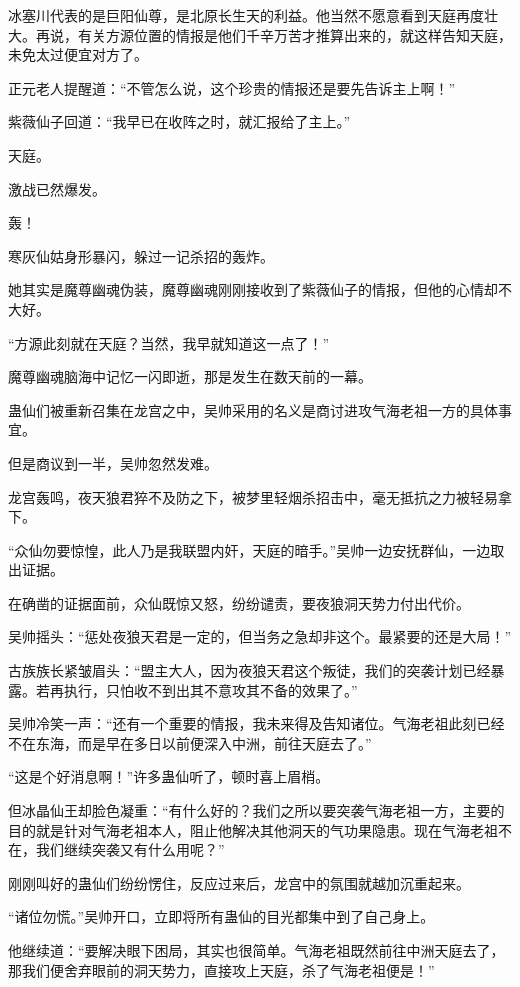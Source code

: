 \begin{this_body}
冰塞川代表的是巨阳仙尊，是北原长生天的利益。他当然不愿意看到天庭再度壮大。再说，有关方源位置的情报是他们千辛万苦才推算出来的，就这样告知天庭，未免太过便宜对方了。

正元老人提醒道：“不管怎么说，这个珍贵的情报还是要先告诉主上啊！”

紫薇仙子回道：“我早已在收阵之时，就汇报给了主上。”

天庭。

激战已然爆发。

轰！

寒灰仙姑身形暴闪，躲过一记杀招的轰炸。

她其实是魔尊幽魂伪装，魔尊幽魂刚刚接收到了紫薇仙子的情报，但他的心情却不大好。

“方源此刻就在天庭？当然，我早就知道这一点了！”

魔尊幽魂脑海中记忆一闪即逝，那是发生在数天前的一幕。

蛊仙们被重新召集在龙宫之中，吴帅采用的名义是商讨进攻气海老祖一方的具体事宜。

但是商议到一半，吴帅忽然发难。

龙宫轰鸣，夜天狼君猝不及防之下，被梦里轻烟杀招击中，毫无抵抗之力被轻易拿下。

“众仙勿要惊惶，此人乃是我联盟内奸，天庭的暗手。”吴帅一边安抚群仙，一边取出证据。

在确凿的证据面前，众仙既惊又怒，纷纷谴责，要夜狼洞天势力付出代价。

吴帅摇头：“惩处夜狼天君是一定的，但当务之急却非这个。最紧要的还是大局！”

古族族长紧皱眉头：“盟主大人，因为夜狼天君这个叛徒，我们的突袭计划已经暴露。若再执行，只怕收不到出其不意攻其不备的效果了。”

吴帅冷笑一声：“还有一个重要的情报，我未来得及告知诸位。气海老祖此刻已经不在东海，而是早在多日以前便深入中洲，前往天庭去了。”

“这是个好消息啊！”许多蛊仙听了，顿时喜上眉梢。

但冰晶仙王却脸色凝重：“有什么好的？我们之所以要突袭气海老祖一方，主要的目的就是针对气海老祖本人，阻止他解决其他洞天的气功果隐患。现在气海老祖不在，我们继续突袭又有什么用呢？”

刚刚叫好的蛊仙们纷纷愣住，反应过来后，龙宫中的氛围就越加沉重起来。

“诸位勿慌。”吴帅开口，立即将所有蛊仙的目光都集中到了自己身上。

他继续道：“要解决眼下困局，其实也很简单。气海老祖既然前往中洲天庭去了，那我们便舍弃眼前的洞天势力，直接攻上天庭，杀了气海老祖便是！”


\end{this_body}
